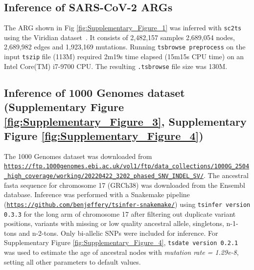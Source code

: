 \documentclass[unnumsec,webpdf,contemporary,large,namedate]{oup-authoring-template}
\begin{document}
\subsection{Inference of SARS-CoV-2 ARGs}
The ARG shown in Fig \ref{fig:Supplementary_Figure_1} was inferred with
\texttt{sc2ts}~\citep{zhang2023biobank} using the Viridian
dataset~\citep{hunt2024addressing}. It consists of
2,482,157 samples
2,689,054 nodes,
2,689,982 edges
and
1,923,169 mutations.
Running \texttt{tsbrowse preprocess} on the input \texttt{tszip} file (113M)
required 2m19s time elapsed (15m15s CPU time) on an Intel Core(TM) i7-9700 CPU.
The resulting \texttt{.tsbrowse} file size was 130M.


\subsection{Inference of 1000 Genomes dataset (Supplementary Figure
\ref{fig:Supplementary_Figure_3}, Supplementary Figure
\ref{fig:Supplementary_Figure_4})} The 1000 Genomes dataset was downloaded from
\texttt{\url{https://ftp.1000genomes.ebi.ac.uk/vol1/ftp/data_collections/1000G_2504_high_coverage/working/20220422_3202_phased_SNV_INDEL_SV/}}.
The ancestral fasta sequence for chromosome 17 (GRCh38) was downloaded
from the Ensembl database. Inference was performed with a Snakemake pipeline
(\texttt{\url{https://github.com/benjeffery/tsinfer-snakemake/}}) using
\texttt{tsinfer version 0.3.3} for the long arm of chromosome 17 after
filtering out duplicate variant positions, variants with missing or low quality
ancestral allele, singletons, n-1-tons and n-2-tons. Only bi-allelic SNPs were
included for inference. For Supplementary Figure \ref{fig:Supplementary_Figure_4}, 
\texttt{tsdate version 0.2.1} was used to estimate the age of ancestral nodes
 with \textit{mutation rate = 1.29e-8}, setting all other parameters to default 
 values. 
\end{document}
